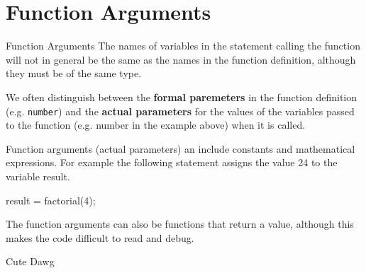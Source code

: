 \documentclass[../lecture4-functions.tex]{subfiles}
\begin{document}
\section{Function Arguments}


\begin{frame}[fragile]{Function Arguments}
    The names of variables in the statement calling the function will not in general be the same as the names in the function definition, although they must be of the same type. \newline

    We often distinguish between the \textbf{formal paremeters} in the function definition (e.g. \verb|number|) and the \textbf{actual parameters} for the values of the variables passed to the function (e.g. number in the example above) when it is called.
\end{frame}


\begin{frame}[fragile]{}
    Function arguments (actual parameters) an include constants and mathematical expressions. For example the following statement assigns the value 24 to the variable result.

    \begin{cppcode}[lastline = 1]
result = factorial(4);
    \end{cppcode}

    The function arguments can also be functions that return a value, although this makes the code difficult to read and debug.
\end{frame}


\begin{frame}[fragile]{Cute Dawg}
    \begin{center}
    \end{center}
\end{frame}

\end{document}
